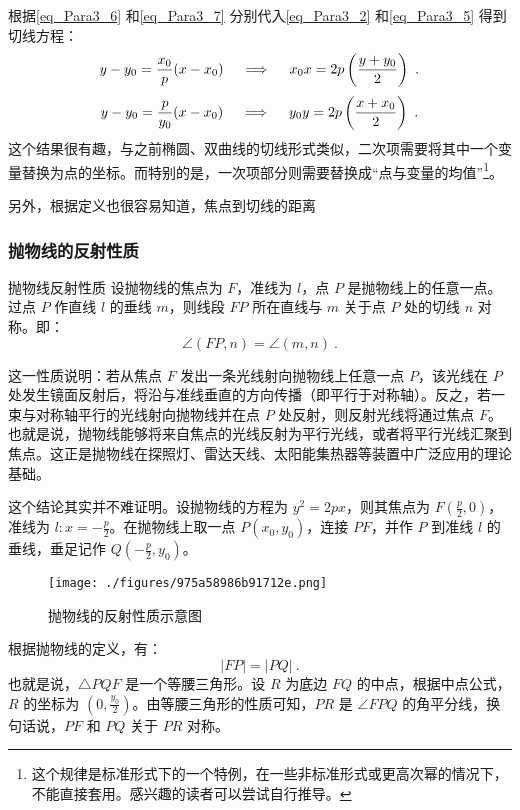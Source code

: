 根据\autoref{eq_Para3_6} 和\autoref{eq_Para3_7} 分别代入\autoref{eq_Para3_2} 和\autoref{eq_Para3_5} 得到切线方程：
\begin{equation}
y-y_0={x_0\over p}(x-x_0)\quad\implies\quad x_0x=2p\left(\frac{y+y_0}{2}\right)~.
\end{equation}
\begin{equation}
y-y_0={p\over y_0}(x-x_0)\quad\implies\quad y_0y=2p\left(\frac{x+x_0}{2}\right)~.
\end{equation}
这个结果很有趣，与之前椭圆、双曲线的切线形式类似，二次项需要将其中一个变量替换为点的坐标。而特别的是，一次项部分则需要替换成“点与变量的均值”\footnote{这个规律是标准形式下的一个特例，在一些非标准形式或更高次幂的情况下，不能直接套用。感兴趣的读者可以尝试自行推导。}。

另外，根据定义也很容易知道，焦点到切线的距离
\subsubsection{抛物线的反射性质}

\begin{theorem}{抛物线反射性质}
设抛物线的焦点为 $F$，准线为 $l$，点 $P$ 是抛物线上的任意一点。过点 $P$ 作直线 $l$ 的垂线 $m$，则线段 $FP$ 所在直线与 $m$ 关于点 $P$ 处的切线 $n$ 对称。即：
\begin{equation}
\angle(FP, n) = \angle(m, n)~.
\end{equation}
\end{theorem}

这一性质说明：若从焦点 $F$ 发出一条光线射向抛物线上任意一点 $P$，该光线在 $P$ 处发生镜面反射后，将沿与准线垂直的方向传播（即平行于对称轴）。反之，若一束与对称轴平行的光线射向抛物线并在点 $P$ 处反射，则反射光线将通过焦点 $F$。也就是说，抛物线能够将来自焦点的光线反射为平行光线，或者将平行光线汇聚到焦点。这正是抛物线在探照灯、雷达天线、太阳能集热器等装置中广泛应用的理论基础。

这个结论其实并不难证明。设抛物线的方程为 $y^2 = 2px$，则其焦点为 $\displaystyle F\left(\frac{p}{2}, 0\right)$，准线为 $\displaystyle l: x = -\frac{p}{2}$。在抛物线上取一点 $P(x_0, y_0)$，连接 $PF$，并作 $P$ 到准线 $l$ 的垂线，垂足记作 $Q\left( \displaystyle -\frac{p}{2}, y_0 \right)$。

\begin{figure}[ht]
\centering
\texttt{[image: ./figures/975a58986b91712e.png]}
\caption{抛物线的反射性质示意图} \label{fig_Para3_3}
\end{figure}

根据抛物线的定义，有：
\begin{equation}
|FP| = |PQ|~.
\end{equation}
也就是说，$\triangle PQF$ 是一个等腰三角形。设 $R$ 为底边 $FQ$ 的中点，根据中点公式，$R$ 的坐标为 $\displaystyle \left( 0, \frac{y_0}{2} \right)$。由等腰三角形的性质可知，$PR$ 是 $\angle FPQ$ 的角平分线，换句话说，$PF$ 和 $PQ$ 关于 $PR$ 对称。

